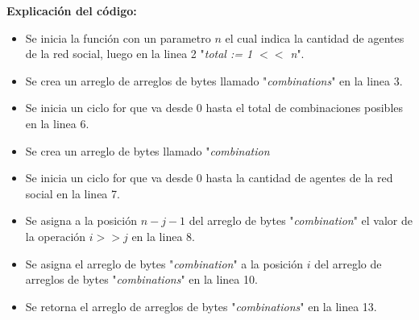 \documentclass[letterpaper,10pt]{article}
\begin{document}
\textbf{Explicación del código:}
\begin{itemize}
  \item Se inicia la función con un parametro $n$ el cual indica la cantidad de agentes de la red social, luego en la linea 2 "\textit{total := 1 $<<$ n}".
  \item Se crea un arreglo de arreglos de bytes llamado "\textit{combinations}" en la linea 3.
  \item Se inicia un ciclo for que va desde 0 hasta el total de combinaciones posibles en la linea 6.
  \item Se crea un arreglo de bytes llamado "\textit{combination}
  \item Se inicia un ciclo for que va desde 0 hasta la cantidad de agentes de la red social en la linea 7.
  \item Se asigna a la posición $n-j-1$ del arreglo de bytes "\textit{combination}" el valor de la operación $i >> j$ en la linea 8.
  \item Se asigna el arreglo de bytes "\textit{combination}" a la posición $i$ del arreglo de arreglos de bytes "\textit{combinations}" en la linea 10.
  \item Se retorna el arreglo de arreglos de bytes "\textit{combinations}" en la linea 13.
\end{itemize}
\end{document}
